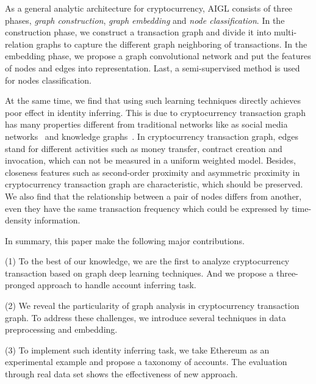 As a general analytic architecture for cryptocurrency, AIGL consists of three phases, \emph{graph construction}, \emph{graph embedding} and \emph{node classification}. In the construction phase, we construct a transaction graph and divide it into multi-relation graphs to capture the different graph neighboring of transactions. In the embedding phase, we propose a graph convolutional network and put the features of nodes and edges into representation. Last, a semi-supervised method is used for nodes classification.

At the same time, we find that using such learning techniques directly achieves poor effect in identity inferring. This is due to cryptocurrency transaction graph has many properties different from traditional networks like as social media networks~\cite{geng2015learning} and knowledge graphs~\cite{bollacker2008freebase}. In cryptocurrency transaction graph, edges stand for different activities such as money transfer, contract creation and invocation, which can not be measured in a uniform weighted model. Besides, closeness features such as second-order proximity and asymmetric proximity in cryptocurrency transaction graph are characteristic, which should be preserved. We also find that the relationship between a pair of nodes differs from another, even they have the same transaction frequency which could be expressed by time-density information.

In summary, this paper make the following major contributions.

(1) To the best of our knowledge, we are the first to analyze cryptocurrency transaction based on graph deep learning techniques. And we propose a three-pronged approach to handle account inferring task.

(2) We reveal the particularity of graph analysis in cryptocurrency transaction graph. To address these challenges, we introduce several techniques in data preprocessing and embedding.

(3) To implement such identity inferring task, we take Ethereum as an experimental example and propose a taxonomy of accounts. The evaluation through real data set shows the effectiveness of new approach.




